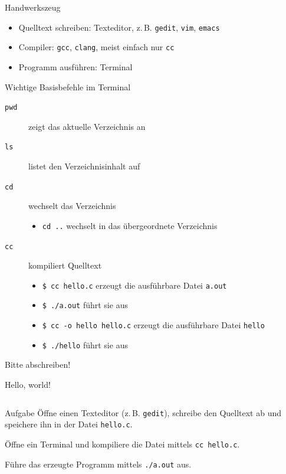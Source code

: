 \documentclass[
  aspectratio=1610,
]{beamer}
\begin{document}
\begin{frame}{Handwerkszeug}
  \begin{itemize}
    \item Quelltext schreiben: Texteditor,
      z.\,B. \texttt{gedit}, \texttt{vim}, \texttt{emacs}
    \item Compiler: \texttt{gcc}, \texttt{clang}, meist einfach nur \texttt{cc}
    \item Programm ausführen: Terminal
  \end{itemize}

  \pause{}

  \begin{block}{Wichtige Basisbefehle im Terminal}
    \begin{description}
      \item[\texttt{pwd}] zeigt das aktuelle Verzeichnis an
      \item[\texttt{ls}] listet den Verzeichnisinhalt auf
      \item[\texttt{cd}] wechselt das Verzeichnis
        \begin{itemize}
          \item \texttt{cd ..} wechselt in das übergeordnete Verzeichnis %
        \end{itemize}
      \item[\texttt{cc}] kompiliert Quelltext
        \begin{itemize}
          \item \texttt{\$ cc hello.c} erzeugt die ausführbare Datei \texttt{a.out}
          \item \texttt{\$ ./a.out} führt sie aus
          \item \texttt{\$ cc -o hello hello.c} erzeugt die ausführbare Datei \texttt{hello}
          \item \texttt{\$ ./hello} führt sie aus
        \end{itemize}
    \end{description}
    Bitte abschreiben!
  \end{block}
\end{frame}

\begin{frame}{Hello, world!}
  \inputminted{c}{hello.c}

  \begin{block}{Aufgabe}
    Öffne einen Texteditor (z.\,B. \texttt{gedit}), schreibe den Quelltext ab und
    speichere ihn in der Datei \texttt{hello.c}.

    Öffne ein Terminal und kompiliere die Datei mittels \texttt{cc hello.c}.

    Führe das erzeugte Programm mittels \texttt{./a.out} aus.
  \end{block}
\end{frame}
\end{document}
